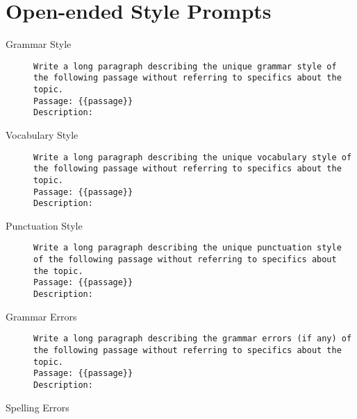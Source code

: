 \section{Open-ended Style Prompts}
\label{sec:appendix:openPrompts}
\begin{description}
  \item[Grammar Style]\leavevmode \newline
        \begin{minipage}{\linewidth}
          \begin{lstlisting}
Write a long paragraph describing the unique grammar style of the following passage without referring to specifics about the topic.
Passage: {{passage}}
Description:
\end{lstlisting}
        \end{minipage}
  \item[Vocabulary Style]\leavevmode \newline
        \begin{minipage}{\linewidth}
          \begin{lstlisting}
Write a long paragraph describing the unique vocabulary style of the following passage without referring to specifics about the topic.
Passage: {{passage}}
Description:
\end{lstlisting}
        \end{minipage}
  \item[Punctuation Style]\leavevmode \newline
        \begin{minipage}{\linewidth}
          \begin{lstlisting}
Write a long paragraph describing the unique punctuation style of the following passage without referring to specifics about the topic.
Passage: {{passage}}
Description:
\end{lstlisting}
        \end{minipage}
  \item[Grammar Errors]\leavevmode \newline
        \begin{minipage}{\linewidth}
          \begin{lstlisting}
Write a long paragraph describing the grammar errors (if any) of the following passage without referring to specifics about the topic.
Passage: {{passage}}
Description:
\end{lstlisting}
        \end{minipage}
  \item[Spelling Errors]\leavevmode \newline

\end{description}
